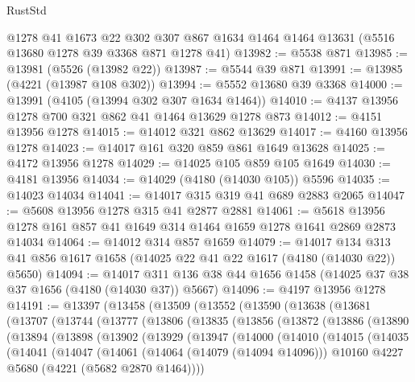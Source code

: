 \begin{lexlean}{RustStd}
\begin{coremodule}
{\begin{coremodule}
{{{{{{{{{{{{{{{{{{{{{{{{{{{{{{{    @1278
    @41
    @1673
    @22
    @302
    @307
    @867
    @1634
    @1464
    @1464
    @13631
    (@5516 @13680 @1278 @39 @3368 @871 @1278 @41)
@13982 := @5538 @871
@13985 := @13981 (@5526 (@13982 @22))
@13987 := @5544 @39 @871
@13991 := @13985 (@4221 (@13987 @108 @302))
@13994 := @5552 @13680 @39 @3368
@14000 := @13991 (@4105 (@13994 @302 @307 @1634 @1464))
@14010 := @4137 @13956 @1278 @700 @321 @862 @41 @1464 @13629 @1278 @873
@14012 := @4151 @13956 @1278
@14015 := @14012 @321 @862 @13629
@14017 := @4160 @13956 @1278
@14023 := @14017 @161 @320 @859 @861 @1649 @13628
@14025 := @4172 @13956 @1278
@14029 := @14025 @105 @859 @105 @1649
@14030 := @4181 @13956
@14034 := @14029 (@4180 (@14030 @105)) @5596
@14035 := @14023 @14034
@14041 := @14017 @315 @319 @41 @689 @2883 @2065
@14047 := @5608 @13956 @1278 @315 @41 @2877 @2881
@14061 := @5618 @13956 @1278 @161 @857 @41 @1649 @314 @1464 @1659 @1278 @1641 @2869 @2873 @14034
@14064 := @14012 @314 @857 @1659
@14079 := @14017
    @134
    @313
    @41
    @856
    @1617
    @1658
    (@14025 @22 @41 @22 @1617 (@4180 (@14030 @22)) @5650)
@14094 := @14017 @311 @136 @38 @44 @1656 @1458 (@14025 @37 @38 @37 @1656 (@4180 (@14030 @37)) @5667)
@14096 := @4197 @13956 @1278
@14191 := @13397
    (@13458
      (@13509
        (@13552
          (@13590
            (@13638
              (@13681
                (@13707
                  (@13744
                    (@13777
                      (@13806
                        (@13835
                          (@13856
                            (@13872
                              (@13886
                                (@13890
                                  (@13894
                                    (@13898
                                      (@13902
                                        (@13929
                                          (@13947
                                            (@14000
                                              (@14010
                                                (@14015
                                                  (@14035
                                                    (@14041
                                                      (@14047
                                                        (@14061
                                                          (@14064 (@14079 (@14094 @14096)))
                                                          @10160
                                                          @4227
                                                          @5680
                                                          (@4221 (@5682 @2870 @1464))))
}}}}}}}}}}}}}}}}}}}}}}}}}}}}}}}
\end{coremodule}}
\end{coremodule}
\end{lexlean}
